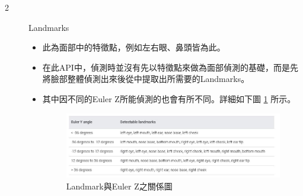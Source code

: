 \documentclass[12pt]{article}  %
\theoremstyle{plain}
\begin{document}
\begin{itemize}
\begin{description}
\item[2] Landmarks
\begin{itemize}
\item 此為面部中的特徵點，例如左右眼、鼻頭皆為此。
\item 在此API中，偵測時並沒有先以特徵點來做為面部偵測的基礎，而是先將臉部整體偵測出來後從中提取出所需要的Landmarks。
\item 其中因不同的Euler Z所能偵測的也會有所不同。詳細如下圖 \ref{Landmark與EulerZ之關係圖} 所示。
\begin{figure}[htbp]
\centering
\includegraphics[width=15cm]{pic/ch3/Landmarks.JPG}
\caption{Landmark與Euler Z之關係圖} \label{Landmark與EulerZ之關係圖}
\end{figure}
\end{itemize}


\end{description}
\end{itemize}
\end{document}
